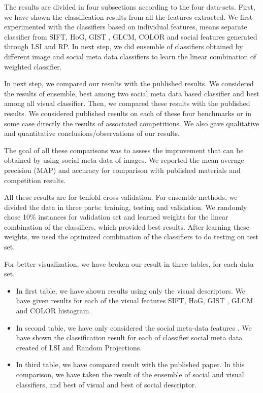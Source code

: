 The results are divided in four subsections according to the four data-sets. First, we have shown  the classification results from all the features  extracted. We first experimented with the classifiers based on individual features, means separate classifier from SIFT, HoG,
GIST , GLCM, COLOR and social features generated through LSI and RP. In next step, we did ensemble of classifiers obtained by different image and social meta data classifiers to learn the linear combination of weighted classifier.

In next step, we compared our results with the published results. We considered the results of ensemble, best among two social meta data based classifier and best among all visual classifier. Then, we compared these results with the published results. We considered  published results on each of these four benchmarks or in some case directly the results of associated competitions. We also gave qualitative and quantitative conclusions/observations  of our results.

The goal of all these comparisons was to assess the improvement that can be obtained by using social meta-data of images. We reported the mean average precision (MAP) and accuracy for comparison with published materials and competition results.

All these results are for tenfold cross validation. For ensemble methods, we divided the data in three parts: training, testing and validation. We randomly chose 10\% instances for validation set and learned weights for the linear combination of the classifiers, which provided best results. After learning these weights, we used the optimized combination of the classifiers to do testing on test set.

For better visualization, we have broken our result in three tables, for each data set.
\begin{itemize}
\item In first table, we have shown results using only the visual descriptors. We have given results for each of the visual features SIFT, HoG, GIST , GLCM and COLOR histogram.
\item In second table, we have only considered the social meta-data features . We have shown the classification result for each of classifier social meta data created of LSI and Random Projections.
\item In third table, we have compared result with the published paper. In this comparison, we have taken the result of the ensemble of social and visual classifiers, and best of visual and best of social descriptor.
\end{itemize}


